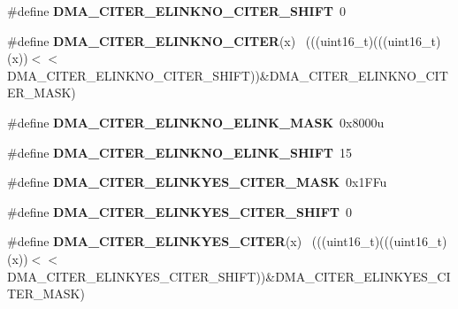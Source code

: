\begin{DoxyCompactItemize}
\item 
\hypertarget{group___d_m_a___register___masks_ga8f8d80baa5e4e362665d8eb9781b09da}{}\#define {\bfseries D\+M\+A\+\_\+\+C\+I\+T\+E\+R\+\_\+\+E\+L\+I\+N\+K\+N\+O\+\_\+\+C\+I\+T\+E\+R\+\_\+\+S\+H\+I\+F\+T}~0\label{group___d_m_a___register___masks_ga8f8d80baa5e4e362665d8eb9781b09da}

\item 
\hypertarget{group___d_m_a___register___masks_gab12f46a19ea1c4bb5531a36cf6fa7c8d}{}\#define {\bfseries D\+M\+A\+\_\+\+C\+I\+T\+E\+R\+\_\+\+E\+L\+I\+N\+K\+N\+O\+\_\+\+C\+I\+T\+E\+R}(x)                          ~(((uint16\+\_\+t)(((uint16\+\_\+t)(x))$<$$<$D\+M\+A\+\_\+\+C\+I\+T\+E\+R\+\_\+\+E\+L\+I\+N\+K\+N\+O\+\_\+\+C\+I\+T\+E\+R\+\_\+\+S\+H\+I\+F\+T))\&D\+M\+A\+\_\+\+C\+I\+T\+E\+R\+\_\+\+E\+L\+I\+N\+K\+N\+O\+\_\+\+C\+I\+T\+E\+R\+\_\+\+M\+A\+S\+K)\label{group___d_m_a___register___masks_gab12f46a19ea1c4bb5531a36cf6fa7c8d}

\item 
\hypertarget{group___d_m_a___register___masks_ga97ca9c4d99839ee12bc10c712101038a}{}\#define {\bfseries D\+M\+A\+\_\+\+C\+I\+T\+E\+R\+\_\+\+E\+L\+I\+N\+K\+N\+O\+\_\+\+E\+L\+I\+N\+K\+\_\+\+M\+A\+S\+K}~0x8000u\label{group___d_m_a___register___masks_ga97ca9c4d99839ee12bc10c712101038a}

\item 
\hypertarget{group___d_m_a___register___masks_ga70c898d132a15d1d18b5a2d5863188a3}{}\#define {\bfseries D\+M\+A\+\_\+\+C\+I\+T\+E\+R\+\_\+\+E\+L\+I\+N\+K\+N\+O\+\_\+\+E\+L\+I\+N\+K\+\_\+\+S\+H\+I\+F\+T}~15\label{group___d_m_a___register___masks_ga70c898d132a15d1d18b5a2d5863188a3}

\item 
\hypertarget{group___d_m_a___register___masks_ga6d3dc490db41703ee3444ab83abd49fc}{}\#define {\bfseries D\+M\+A\+\_\+\+C\+I\+T\+E\+R\+\_\+\+E\+L\+I\+N\+K\+Y\+E\+S\+\_\+\+C\+I\+T\+E\+R\+\_\+\+M\+A\+S\+K}~0x1\+F\+Fu\label{group___d_m_a___register___masks_ga6d3dc490db41703ee3444ab83abd49fc}

\item 
\hypertarget{group___d_m_a___register___masks_ga73c42915d2235324c9b45698eabb87b4}{}\#define {\bfseries D\+M\+A\+\_\+\+C\+I\+T\+E\+R\+\_\+\+E\+L\+I\+N\+K\+Y\+E\+S\+\_\+\+C\+I\+T\+E\+R\+\_\+\+S\+H\+I\+F\+T}~0\label{group___d_m_a___register___masks_ga73c42915d2235324c9b45698eabb87b4}

\item 
\hypertarget{group___d_m_a___register___masks_gaff72808b5af7e6622b5fca2256612dc6}{}\#define {\bfseries D\+M\+A\+\_\+\+C\+I\+T\+E\+R\+\_\+\+E\+L\+I\+N\+K\+Y\+E\+S\+\_\+\+C\+I\+T\+E\+R}(x)                        ~(((uint16\+\_\+t)(((uint16\+\_\+t)(x))$<$$<$D\+M\+A\+\_\+\+C\+I\+T\+E\+R\+\_\+\+E\+L\+I\+N\+K\+Y\+E\+S\+\_\+\+C\+I\+T\+E\+R\+\_\+\+S\+H\+I\+F\+T))\&D\+M\+A\+\_\+\+C\+I\+T\+E\+R\+\_\+\+E\+L\+I\+N\+K\+Y\+E\+S\+\_\+\+C\+I\+T\+E\+R\+\_\+\+M\+A\+S\+K)\label{group___d_m_a___register___masks_gaff72808b5af7e6622b5fca2256612dc6}


\end{DoxyCompactItemize}
